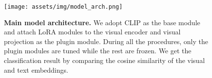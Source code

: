 \begin{figure}[t]
    \centering
    \texttt{[image: assets/img/model\_arch.png]}
    \caption{\textbf{Main model architecture.} We adopt CLIP as the base module and attach LoRA modules to the visual encoder and visual projection as the plugin module. During all the procedures, only the plugin modules are tuned while the rest are frozen. We get the classification result by comparing the cosine similarity of the visual and text embeddings.}
    \label{fig:model_arch}
\end{figure}
